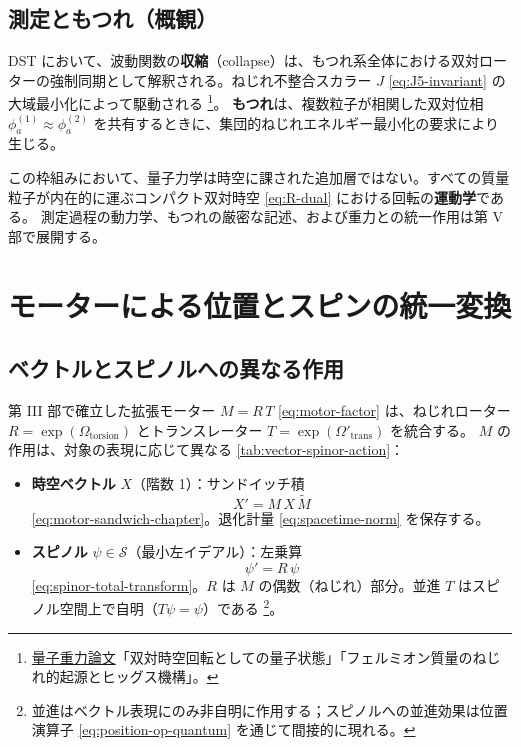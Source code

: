 \documentclass[dvipdfmx,a4paper,oneside]{jsbook}
\numberwithin{equation}{chapter}
\begin{document}
\subsection{測定ともつれ（概観）}

DST において、波動関数の\textbf{収縮}（collapse）は、もつれ系全体における双対ローターの強制同期として解釈される。ねじれ不整合スカラー \(J\) \eqref{eq:J5-invariant} の大域最小化によって駆動される \footnote{\hyperref[sec:sister-manuscripts]{量子重力論文}「双対時空回転としての量子状態」「フェルミオン質量のねじれ的起源とヒッグス機構」。}。
\textbf{もつれ}は、複数粒子が相関した双対位相 \(\phi_a^{(1)} \approx \phi_a^{(2)}\) を共有するときに、集団的ねじれエネルギー最小化の要求により生じる。

この枠組みにおいて、量子力学は時空に課された追加層ではない。すべての質量粒子が内在的に運ぶコンパクト双対時空 \eqref{eq:R-dual} における回転の\textbf{運動学}である。
測定過程の動力学、もつれの厳密な記述、および重力との統一作用は第 V 部で展開する。

\section{モーターによる位置とスピンの統一変換}

\subsection{ベクトルとスピノルへの異なる作用}

第 III 部で確立した拡張モーター \(M = R\,T\) \eqref{eq:motor-factor} は、ねじれローター \(R = \exp(\Omega_{\mathrm{torsion}})\) とトランスレーター \(T = \exp(\Omega'_{\mathrm{trans}})\) を統合する。
\(M\) の作用は、対象の表現に応じて異なる \eqref{tab:vector-spinor-action}：

\begin{itemize}[leftmargin=2em]
  \item \textbf{時空ベクトル} \(X\)（階数 1）：サンドイッチ積
  \begin{equation}
    X' = M\,X\,\widetilde{M}
    \label{eq:motor-vector}
  \end{equation}
  \eqref{eq:motor-sandwich-chapter}。退化計量 \eqref{eq:spacetime-norm} を保存する。
  \item \textbf{スピノル} \(\psi \in \mathcal{S}\)（最小左イデアル）：左乗算
  \begin{equation}
    \psi' = R\,\psi
    \label{eq:motor-spinor}
  \end{equation}
  \eqref{eq:spinor-total-transform}。\(R\) は \(M\) の偶数（ねじれ）部分。並進 \(T\) はスピノル空間上で自明（\(T\psi = \psi\)）である \footnote{並進はベクトル表現にのみ非自明に作用する；スピノルへの並進効果は位置演算子 \eqref{eq:position-op-quantum} を通じて間接的に現れる。}。
\end{itemize}
\end{document}

